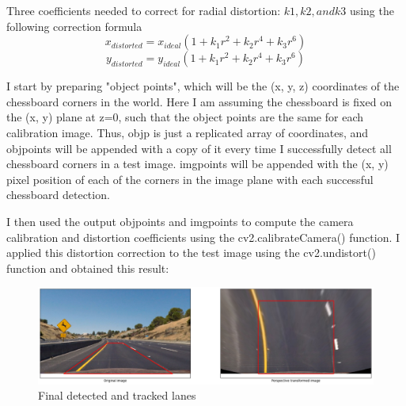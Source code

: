     		Three coefficients needed to correct for radial distortion: \(k1, k2, and k3\) using the following correction formula
    		\begin{equation}
    		    x_{distorted} = x_{ideal} (1 + k_1 r^2 + k_2 r^4 + k_3 r^6)
    		\end{equation}
    		\begin{equation}
    		y_{distorted} = y_{ideal} (1 + k_1 r^2 + k_2 r^4 + k_3 r^6)
    		\end{equation}


    
    
        	I start by preparing "object points", which will be the (x, y, z) coordinates of the chessboard corners in the world. Here I am assuming the chessboard is fixed on the (x, y) plane at z=0, such that the object points are the same for each calibration image. Thus, objp is just a replicated array of coordinates, and objpoints will be appended with a copy of it every time I successfully detect all chessboard corners in a test image. imgpoints will be appended with the (x, y) pixel position of each of the corners in the image plane with each successful chessboard detection.
            
            I then used the output objpoints and imgpoints to compute the camera calibration and distortion coefficients using the cv2.calibrateCamera() function. I applied this distortion correction to the test image using the cv2.undistort() function and obtained this result:
    
            

            
            \begin{figure}[htbp]
            \centerline{\includegraphics[width=\linewidth]{Figures/perspective_test2.png}}
            \caption{Final detected and tracked lanes}
            \end{figure}
            
